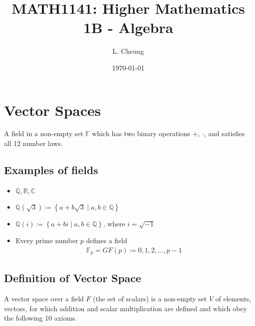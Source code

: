\documentclass{report}
\title{\textbf{MATH1141: Higher Mathematics 1B - Algebra}}
\author{L. Cheung}
\date{\today}
\begin{document}
\maketitle
\tableofcontents
\newpage

\chapter{Vector Spaces}

	A field in a non-empty set $\mathbb{F}$ which has two binary operations $+$, $\cdot$, and satisfies all 12 number laws.

	\section{Examples of fields}

		\begin{itemize}
			\item $\mathbb{Q}, \mathbb{R}, \mathbb{C}$
			\item $\mathbb{Q}(\sqrt{3}) \coloneq \left\{ a + b\sqrt{3} \;|\; a,b \in \mathbb{Q}\right\}$
			\item $\mathbb{Q}(i) \coloneq \left\{a + bi \;|\; a,b \in \mathbb{Q}\right\}$, where $i = \sqrt{-1}$
			\item Every prime number $p$ defines a field
				\begin{align*}
					\mathbb{F}_p = GF(p) \coloneq {0,1,2,...,p-1}
				\end{align*}
		\end{itemize}

	\section{Definition of Vector Space}

		A vector space over a field $F$ (the set of scalars) is a non-empty set $V$ of elements, vectors, for which addition and scalar multiplication are defined and which obey the following 10 axioms.
		
\end{document}

